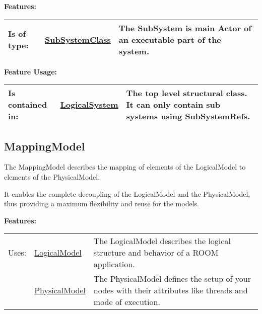 		
		
	\begingroup
	\textbf{Features:}
	\renewcommand{\arraystretch}{1.8} %
	\begin{longtable}{l|l p{}}
		\hline
	Is of type: & \tabitem \hyperlink{ref:SubSystemClass}{SubSystemClass}  & The SubSystem is main Actor of an executable part of the system. \\
	\hline
	\end{longtable}
	\endgroup
		
	\begingroup
	\textbf{Feature Usage:}
	\renewcommand{\arraystretch}{1.8} %
	\begin{longtable}{l|l p{}}
		\hline
	Is contained in: & \tabitem \hyperlink{ref:LogicalSystem}{LogicalSystem}  & The top level structural class. It can only contain sub systems using SubSystemRefs.\\
	\hline
	\end{longtable}
	\endgroup
		
	
	\vspace{\baselineskip}
	\vspace{\baselineskip}
	\vspace{\baselineskip}
	
\subsection{MappingModel}
	\hypertarget{ref:MappingModel}{}
	The MappingModel describes the mapping of elements of the LogicalModel to elements of the PhysicalModel.
		
	It enables the complete decoupling of the LogicalModel and the PhysicalModel, thus providing a maximum flexibility and reuse for the models.
		
		
	\begingroup
	\textbf{Features:}
	\renewcommand{\arraystretch}{1.8} %
	\begin{longtable}{l|l p{}}
		\hline
	Uses: & \tabitem \hyperlink{ref:LogicalModel}{LogicalModel}  & The LogicalModel describes the logical structure and behavior of a ROOM application.\\
	& \tabitem \hyperlink{ref:PhysicalModel}{PhysicalModel}  & The PhysicalModel defines the setup of your nodes with their attributes like threads and mode of execution. \\
	\hline
	\end{longtable}
	\endgroup
		

